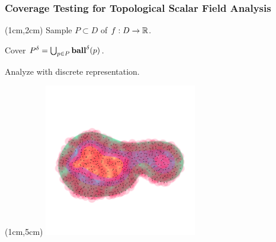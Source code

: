 \begin{frame}
  \frametitle{{\small {\color{red} Coverage Testing for Topological Scalar Field Analysis}}}

  \begin{textblock*}{12cm}(1cm,2cm)
    Sample $P\subset D$ of $f : D\to \mathbb{R}$.\vspace{1ex}

    Cover $P^\delta = \bigcup_{p\in P}\mathbf{ball}^\delta(p)$.\vspace{1ex}

    Analyze with discrete representation.
  \end{textblock*}

  \begin{textblock*}{12cm}(1cm,5cm)
    \includegraphics[trim=200 600 200 800, clip, width=0.5\textwidth]{figures/partial3/cover}
  \end{textblock*}
\end{frame}
